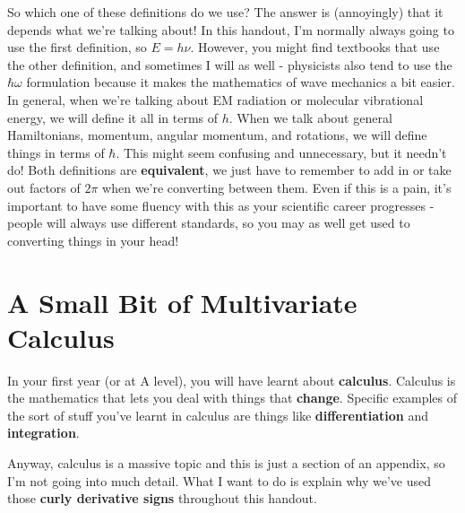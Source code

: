 \documentclass{memoir}[11pt,oneside,a4paper,openany]
\begin{document}
So which one of these definitions do we use? The answer is (annoyingly) that it depends what we're talking about! In this handout, I'm normally always going to use the first definition, so $E=h\nu$. However, you might find textbooks that use the other definition, and sometimes I will as well - physicists also tend to use the $\hbar\omega$ formulation because it makes the mathematics of wave mechanics a bit easier. In general, when we're talking about EM radiation or molecular vibrational energy, we will define it all in terms of $h$. When we talk about general Hamiltonians, momentum, angular momentum, and rotations, we will define things in terms of $\hbar$. This might seem confusing and unnecessary, but it needn't do! Both definitions are \textbf{equivalent}, we just have to remember to add in or take out factors of $2\pi$ when we're converting between them. Even if this is a pain, it's important to have some fluency with this as your scientific career progresses - people will always use different standards, so you may as well get used to converting things in your head!

\chapter{A Small Bit of Multivariate Calculus}\label{app:multivariate_calc}
In your first year (or at A level), you will have learnt about \textbf{calculus}. Calculus is the mathematics that lets you deal with things that \textbf{change}. Specific examples of the sort of stuff you've learnt in calculus are things like \textbf{differentiation} and \textbf{integration}. 

Anyway, calculus is a massive topic and this is just a section of an appendix, so I'm not going into much detail. What I want to do is explain why we've used those \textbf{curly derivative signs} throughout this handout.
\end{document}
